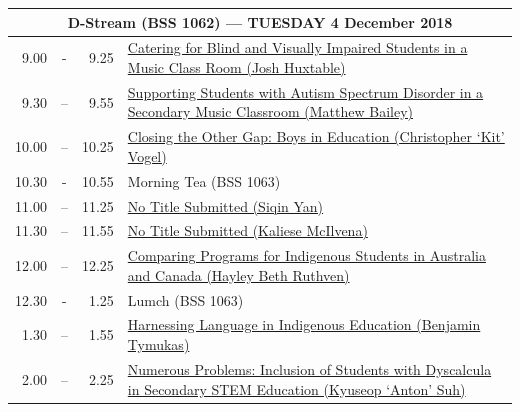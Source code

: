 \documentclass[twoside,12pt,a4paper,notitlepage]{memoir}
\begin{document}
\pagebreak
\begin{center}
\begin{tabular}{rcr|p{10.8cm}}
 \multicolumn{4}{c}{{\large D-Stream (BSS 1062) --- TUESDAY 4 December 2018}} \\ \hline
9.00 & - & 9.25 &
 \hyperref[aut:huxtable]{Catering for Blind and Visually Impaired Students in a Music Class Room (Josh Huxtable)} \\ \hline
9.30 & – & 9.55 &
 \hyperref[aut:bailey]{Supporting Students with Autism Spectrum Disorder in a Secondary Music Classroom (Matthew Bailey)} \\ \hline
10.00 & – & 10.25 &
\hyperref[aut:vogel]{Closing the Other Gap: Boys in Education (Christopher `Kit' Vogel)} \\ \hline
10.30 & - & 10.55 & Morning Tea (BSS 1063) \\ \hline
11.00 & – & 11.25 & 
 \hyperref[aut:yan]{No Title Submitted (Siqin Yan)} \\ \hline
11.30 & – & 11.55 &
 \hyperref[aut:mcilvena]{No Title Submitted (Kaliese McIlvena)} \\ \hline
12.00 & – & 12.25 &
 \hyperref[aut:ruthven]{Comparing Programs for Indigenous Students in Australia and Canada (Hayley Beth Ruthven)} \\ \hline
12.30 & - & 1.25 & Lumch (BSS 1063) \\ \hline
1.30 & – & 1.55 &
 \hyperref[aut:tymukas]{Harnessing Language in Indigenous Education (Benjamin Tymukas)} \\ \hline
2.00 & – & 2.25 & 
\hyperref[aut:suh]{Numerous Problems: Inclusion of Students with Dyscalcula in Secondary STEM Education (Kyuseop `Anton' Suh)} \\ \hline
\end{tabular}
\end{center}
\end{document}
